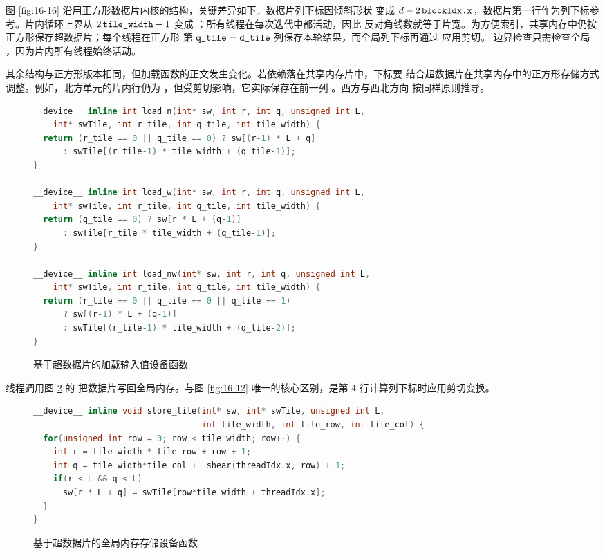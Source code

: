 图 \ref{fig:16-16} 沿用正方形数据片内核的结构，关键差异如下。数据片列下标因倾斜形状
变成 $d-2\,\code{blockIdx.x}$，数据片第一行作为列下标参考。片内循环上界从
$2\,\code{tile_width}-1$ 变成 ；所有线程在每次迭代中都活动，因此
反对角线数就等于片宽。为方便索引，共享内存中仍按正方形保存超数据片；每个线程在正方形
第 $\code{q_tile}=\code{d_tile}$ 列保存本轮结果，而全局列下标再通过
 应用剪切。
边界检查只需检查全局 ，因为片内所有线程始终活动。

其余结构与正方形版本相同，但加载函数的正文发生变化。若依赖落在共享内存片中，下标要
结合超数据片在共享内存中的正方形存储方式调整。例如，北方单元的片内行仍为
，但受剪切影响，它实际保存在前一列 。西方与西北方向
按同样原则推导。

\begin{figure}[htbp]
  \centering
  \begin{minipage}{0.99\textwidth}
  \begin{lstlisting}[language=C++,basicstyle=\ttfamily\scriptsize]
__device__ inline int load_n(int* sw, int r, int q, unsigned int L,
    int* swTile, int r_tile, int q_tile, int tile_width) {
  return (r_tile == 0 || q_tile == 0) ? sw[(r-1) * L + q]
      : swTile[(r_tile-1) * tile_width + (q_tile-1)];
}

__device__ inline int load_w(int* sw, int r, int q, unsigned int L,
    int* swTile, int r_tile, int q_tile, int tile_width) {
  return (q_tile == 0) ? sw[r * L + (q-1)]
      : swTile[r_tile * tile_width + (q_tile-1)];
}

__device__ inline int load_nw(int* sw, int r, int q, unsigned int L,
    int* swTile, int r_tile, int q_tile, int tile_width) {
  return (r_tile == 0 || q_tile == 0 || q_tile == 1)
      ? sw[(r-1) * L + (q-1)]
      : swTile[(r_tile-1) * tile_width + (q_tile-2)];
}
  \end{lstlisting}
  \end{minipage}
  \caption{基于超数据片的加载输入值设备函数}
  \label{fig:16-17}
\end{figure}

线程调用图 \ref{fig:16-18} 的  把数据片写回全局内存。与图
\ref{fig:16-12} 唯一的核心区别，是第 4 行计算列下标时应用剪切变换。

\begin{figure}[htbp]
  \centering
  \begin{minipage}{0.94\textwidth}
  \begin{lstlisting}[language=C++,basicstyle=\ttfamily\scriptsize]
__device__ inline void store_tile(int* sw, int* swTile, unsigned int L,
                                  int tile_width, int tile_row, int tile_col) {
  for(unsigned int row = 0; row < tile_width; row++) {
    int r = tile_width * tile_row + row + 1;
    int q = tile_width*tile_col + _shear(threadIdx.x, row) + 1;
    if(r < L && q < L)
      sw[r * L + q] = swTile[row*tile_width + threadIdx.x];
  }
}
  \end{lstlisting}
  \end{minipage}
  \caption{基于超数据片的全局内存存储设备函数}
  \label{fig:16-18}
\end{figure}

